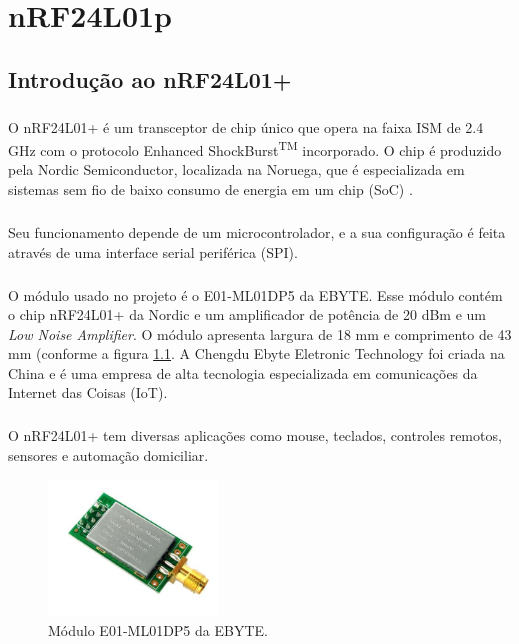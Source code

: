 \chapter{nRF24L01p}
\noindent

\section{Introdução ao nRF24L01+}
\paragraph{} O nRF24L01+ é um transceptor de chip único que opera na faixa ISM de 2.4 GHz com o protocolo Enhanced ShockBurst\textsuperscript{TM} incorporado. O chip é produzido pela Nordic Semiconductor, localizada na Noruega, que é especializada em sistemas sem fio de baixo consumo de energia em um chip (SoC) \citep{Nordic2008}.

\paragraph{} Seu funcionamento depende de um microcontrolador, e a sua configuração é feita através de uma interface serial periférica (SPI).


\paragraph{} O módulo usado no projeto é o E01-ML01DP5 da EBYTE. Esse módulo contém o chip nRF24L01+ da Nordic e um amplificador de potência de 20 dBm e um \textit{Low Noise Amplifier}. O módulo apresenta largura de 18 mm e comprimento de 43 mm (conforme a figura \ref{fig:figura52}. A Chengdu Ebyte Eletronic Technology foi criada na China e é uma empresa de alta tecnologia especializada em comunicações da Internet das Coisas (IoT)\citep{EBYTE}.

\paragraph{} O nRF24L01+ tem diversas aplicações como mouse, teclados, controles remotos, sensores e automação domiciliar.

\begin{figure}[!ht]
	\centering
	\includegraphics[width=0.4\textwidth]{Figuras/nrf24.PNG}   
	\caption{Módulo E01-ML01DP5 da EBYTE. \citep{EBYTE}}
	\label{fig:figura52}
\end{figure}


